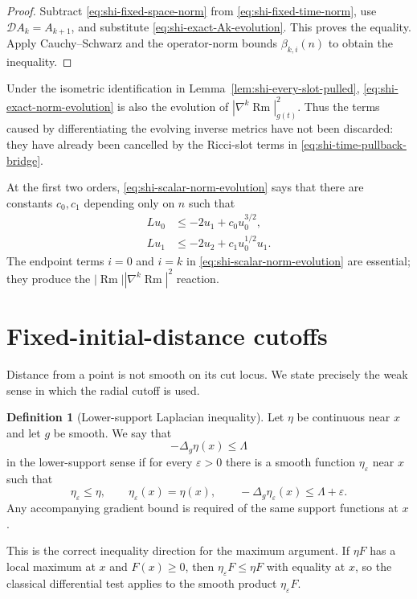 \documentclass[10pt]{coll-l}
\theoremstyle{definition}
\newtheorem{definition}[theorem]{Definition}
\theoremstyle{remark}
\numberwithin{section}{chapter}
\numberwithin{equation}{chapter}
\newcommand{\Rm}{\operatorname{Rm}}
\begin{document}
\begin{proof}
Subtract \eqref{eq:shi-fixed-space-norm} from
\eqref{eq:shi-fixed-time-norm}, use
$\mathcal DA_k=A_{k+1}$, and substitute
\eqref{eq:shi-exact-Ak-evolution}.  This proves the equality.  Apply
Cauchy--Schwarz and the operator-norm bounds $\beta_{k,i}(n)$ to obtain the
inequality.
\end{proof}

Under the isometric identification in
Lemma~\ref{lem:shi-every-slot-pulled},
\eqref{eq:shi-exact-norm-evolution} is also the evolution of
$|\nabla^k\Rm|_{g(t)}^2$.  Thus the terms caused by differentiating the
evolving inverse metrics have not been discarded: they have already been
cancelled by the Ricci-slot terms in
\eqref{eq:shi-time-pullback-bridge}.

At the first two orders, \eqref{eq:shi-scalar-norm-evolution} says that
there are constants $c_0,c_1$ depending only on $n$ such that
\begin{align}
 Lu_0&\leq-2u_1+c_0u_0^{3/2},                            \label{eq:shi-u0-evolution}\\
 Lu_1&\leq-2u_2+c_1u_0^{1/2}u_1.                        \label{eq:shi-u1-evolution}
\end{align}
The endpoint terms $i=0$ and $i=k$ in
\eqref{eq:shi-scalar-norm-evolution} are essential; they produce the
$|\Rm||\nabla^k\Rm|^2$ reaction.

\section{Fixed-initial-distance cutoffs}
\label{sec:shi-cutoffs}

Distance from a point is not smooth on its cut locus.  We state precisely
the weak sense in which the radial cutoff is used.

\begin{definition}[Lower-support Laplacian inequality]
\label{def:shi-lower-support}
Let $\eta$ be continuous near $x$ and let $g$ be smooth.  We say that
\[
                         -\Delta_g\eta(x)\leq\Lambda
\]
in the lower-support sense if for every $\varepsilon>0$ there is a smooth
function $\eta_\varepsilon$ near $x$ such that
\[
 \eta_\varepsilon\leq\eta,
 \qquad \eta_\varepsilon(x)=\eta(x),
 \qquad -\Delta_g\eta_\varepsilon(x)\leq\Lambda+\varepsilon.
\]
Any accompanying gradient bound is required of the same support functions
at $x$.
\end{definition}

This is the correct inequality direction for the maximum argument.  If
$\eta F$ has a local maximum at $x$ and $F(x)\geq0$, then
$\eta_\varepsilon F\leq\eta F$ with equality at $x$, so the classical
differential test applies to the smooth product
$\eta_\varepsilon F$.
\end{document}
